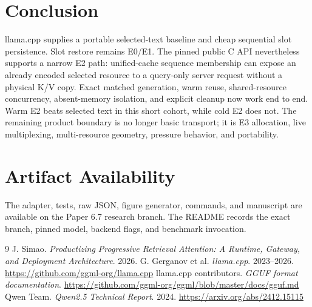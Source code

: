 \documentclass[10pt]{article}
\begin{document}
\section{Conclusion}
llama.cpp supplies a portable selected-text baseline and cheap sequential slot
persistence. Slot restore remains E0/E1. The pinned public C API nevertheless
supports a narrow E2 path: unified-cache sequence membership can expose an
already encoded selected resource to a query-only server request without a
physical K/V copy. Exact matched generation, warm reuse, shared-resource
concurrency, absent-memory isolation, and explicit cleanup now work end to end.
Warm E2 beats selected text in this short cohort, while cold E2 does not. The
remaining product boundary is no longer basic transport; it is E3 allocation,
live multiplexing, multi-resource geometry, pressure behavior, and portability.

\section*{Artifact Availability}
The adapter, tests, raw JSON, figure generator, commands, and manuscript are
available on the Paper 6.7 research branch. The README records the exact branch,
pinned model, backend flags, and benchmark invocation.

\begin{thebibliography}{9}
\scriptsize
{} J. Simao. \emph{Productizing Progressive Retrieval
Attention: A Runtime, Gateway, and Deployment Architecture}. 2026.
 G. Gerganov et al. \emph{llama.cpp}. 2023--2026.
\url{https://github.com/ggml-org/llama.cpp}
 llama.cpp contributors. \emph{GGUF format documentation}.
\url{https://github.com/ggml-org/ggml/blob/master/docs/gguf.md}
 Qwen Team. \emph{Qwen2.5 Technical Report}. 2024.
\url{https://arxiv.org/abs/2412.15115}
\end{thebibliography}
\end{document}
